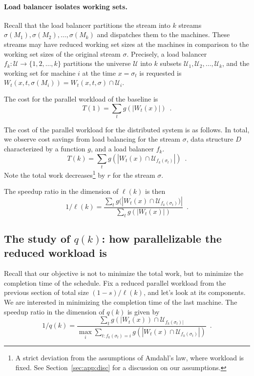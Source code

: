 \paragraph*{Load balancer isolates working sets.}
Recall that the load balancer partitions the stream into $k$ streams $\sigma(M_1), \sigma(M_2), \ldots, \sigma(M_k)$ and dispatches them to the machines.
These streams may have reduced working set sizes at the machines in comparison to the working set sizes of the original stream $\sigma$.
Precisely, a load balancer $f_k : \mathcal{U} \to \{1, 2, \ldots, k\}$ partitions the universe $\mathcal{U}$ into $k$ subsets $\mathcal{U}_1, \mathcal{U}_2, \ldots, \mathcal{U}_k$, and the working set for machine $i$ at the time $x = \sigma_t$ is requested is $W_t(x, t, \sigma(M_i)) = W_t(x, t, \sigma) \cap \mathcal{U}_i$.

The cost for the parallel workload of the baseline is 
\[
	T(1) = \sum_{t} g(|W_t(x)|)\enspace .
\]


The cost of the parallel workload for the distributed system is as follows.
In total, we observe cost savings from load balancing for the stream $\sigma$, data structure $D$ characterized by a function $g$, and a load balancer $f_k$.
\[
	T(k) = \sum_{t} g(|W_t(x) \cap \mathcal{U}_{f_k(\sigma_t)}|) \enspace .
\]
Note the total work decreases\footnote{A strict deviation from the assumptions of Amdahl's law, where workload is fixed. See Section~\ref{sec:app:disc} for a discussion on our assumptions.} by $r$ for the stream $\sigma$.

The speedup ratio in the dimension of $\ell(k)$ is then 
\[
	1/\ell(k) = \frac{\sum_{t} g(|W_t(x) \cap \mathcal{U}_{f_k(\sigma_t)})|}{\sum_{t} g(|W_t(x)|)}  \enspace .
\]



\subsection{The study of $q(k)$: how parallelizable the reduced workload is}

Recall that our objective is not to minimize the total work, but to minimize the completion time of the schedule.
Fix a reduced parallel workload from the previous section of total size $(1-s)/\ell(k)$, and let's look at its components.
We are interested in minimizing the completion time of the last machine. 
The speedup ratio in the dimension of $q(k)$ is given by
\[
	1/q(k) = \frac{\sum_{t} g(|W_t(x)) \cap \mathcal{U}_{f_k(\sigma_t)|}}{\max_i \sum_{t : f_k(\sigma_t) = i} g(|W_t(x) \cap \mathcal{U}_{f_k(\sigma_t)}|)}  \enspace .
\]




